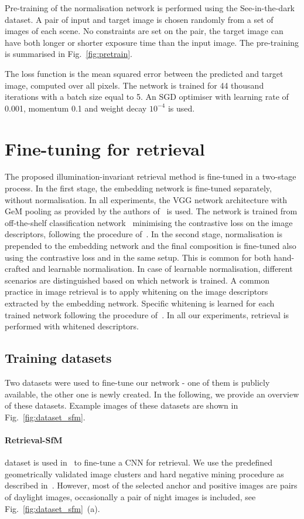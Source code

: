 Pre-training of the normalisation network is performed using the See-in-the-dark dataset. A pair of input and target image is chosen randomly from a set of images of each scene. No constraints are set on the pair, the target image can have both longer or shorter exposure time than the input image. The pre-training is summarised in Fig.~\ref{fig:pretrain}.

The loss function is the mean squared error between the predicted and target image, computed over all pixels. The network is trained for 44 thousand iterations with a batch size equal to 5. An SGD optimiser with learning rate of 0.001, momentum 0.1 and weight decay $10^{-4}$ is used.


\section{Fine-tuning for retrieval}
The proposed illumination-invariant retrieval method is fine-tuned in a two-stage process.
In the first stage, the embedding network is fine-tuned separately, without normalisation. In all experiments, the VGG network architecture with GeM pooling as provided by the authors of~\cite{Radenovic-TPAMI18} is used. The network is trained from off-the-shelf classification network~\cite{SZ14} minimising the contrastive loss on the image descriptors, following the procedure of~\cite{Radenovic-TPAMI18}.
In the second stage, normalisation is prepended to the embedding network and the final composition is fine-tuned also using the contrastive loss and in the same setup. This is common for both hand-crafted and learnable normalisation. In case of learnable normalisation, different scenarios are distinguished based on which network is trained.
A common practice in image retrieval is to apply whitening on the image descriptors extracted by the embedding network. Specific whitening is learned for each trained network following the procedure of~\cite{Radenovic-TPAMI18}. In all our experiments, retrieval is performed with whitened descriptors.

\subsection{Training datasets}
Two datasets were used to fine-tune our network - one of them is publicly available, the other one is newly created. In the following, we provide an overview of these datasets. Example images of these datasets are shown in Fig.~\ref{fig:dataset_sfm}.

\paragraph{Retrieval-SfM} dataset is used in~\cite{Radenovic-TPAMI18} to fine-tune a CNN for retrieval. We use the predefined geometrically validated image clusters and hard negative mining procedure as described in~\cite{Radenovic-TPAMI18}. However, most of the selected anchor and positive images are pairs of daylight images, occasionally a pair of night images is included, see Fig.~\ref{fig:dataset_sfm}~(a). 

